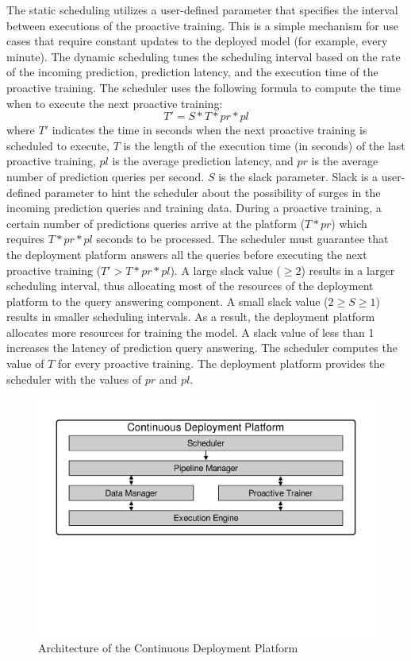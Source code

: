 The static scheduling utilizes a user-defined parameter that specifies the interval between executions of the proactive training.
This is a simple mechanism for use cases that require constant updates to the deployed model (for example, every minute).
The dynamic scheduling tunes the scheduling interval based on the rate of the incoming prediction, prediction latency, and the execution time of the proactive training.
The scheduler uses the following formula to compute the time when to execute the next proactive training:
\begin{equation}
T' = S * T * pr * pl
\end{equation}
where $T'$ indicates the time in seconds when the next proactive training is scheduled to execute, $T$ is the length of the execution time (in seconds) of the last proactive training, $pl$ is the average prediction latency, and $pr$ is the average number of prediction queries per second.
$S$ is the slack parameter.
Slack is a user-defined parameter to hint the scheduler about the possibility of surges in the incoming prediction queries and training data.
During a proactive training, a certain number of predictions queries arrive at the platform ($T * pr$) which requires $T * pr * pl$ seconds to be processed.
The scheduler must guarantee that the deployment platform answers all the queries before executing the next proactive training ($T' > T * pr * pl$).
A large slack value ($\geq2$) results in a larger scheduling interval, thus allocating most of the resources of the deployment platform to the query answering component.
A small slack value ($2 \geq S \geq 1$) results in smaller scheduling intervals.
As a result, the deployment platform allocates more resources for training the model.
A slack value of less than 1 increases the latency of prediction query answering.
The scheduler computes the value of $T$ for every proactive training.
The deployment platform provides the scheduler with the values of $pr$ and $pl$. 

\begin{figure}[h]
\centering
\includegraphics[width=\columnwidth]{../images/system-architecture.pdf}
\caption{Architecture of the Continuous Deployment Platform}
\label{fig:system-architecture}
\end{figure}


